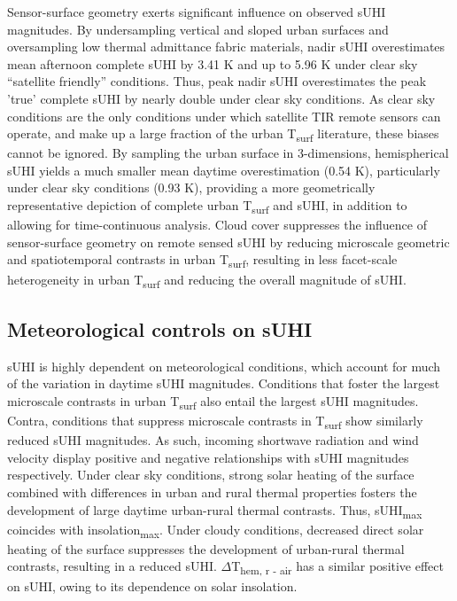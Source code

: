 Sensor-surface geometry exerts significant influence on observed sUHI magnitudes. By undersampling vertical and sloped urban surfaces and oversampling low thermal admittance fabric materials, nadir sUHI overestimates mean afternoon complete sUHI by 3.41 \si{\kelvin} and up to 5.96 \si{\kelvin} under clear sky “satellite friendly” conditions. Thus, peak nadir sUHI overestimates the peak 'true' complete sUHI by nearly double under clear sky conditions. As clear sky conditions are the only conditions under which satellite TIR remote sensors can operate, and make up a large fraction of the urban T\textsubscript{surf} literature, these biases cannot be ignored. By sampling the urban surface in 3-dimensions, hemispherical sUHI yields a much smaller mean daytime overestimation (0.54 \si{\kelvin}), particularly under clear sky conditions (0.93 \si{\kelvin}), providing a more geometrically representative depiction of complete urban T\textsubscript{surf} and sUHI, in addition to allowing for time-continuous analysis. Cloud cover suppresses the influence of sensor-surface geometry on remote sensed sUHI by reducing microscale geometric and spatiotemporal contrasts in urban T\textsubscript{surf}, resulting in less facet-scale heterogeneity in urban T\textsubscript{surf} and reducing the overall magnitude of sUHI.

\subsection{Meteorological controls on sUHI}

sUHI is highly dependent on meteorological conditions, which account for much of the variation in daytime sUHI magnitudes. Conditions that foster the largest microscale contrasts in urban T\textsubscript{surf} also entail the largest sUHI magnitudes. Contra, conditions that suppress microscale contrasts in T\textsubscript{surf} show similarly reduced sUHI magnitudes. As such, incoming shortwave radiation and wind velocity display positive and negative relationships with sUHI magnitudes respectively. Under clear sky conditions, strong solar heating of the surface combined with differences in urban and rural thermal properties fosters the development of large daytime urban-rural thermal contrasts. Thus, sUHI\textsubscript{max} coincides with insolation\textsubscript{max}. Under cloudy conditions, decreased direct solar heating of the surface suppresses the development of urban-rural thermal contrasts, resulting in a reduced sUHI. $\Delta$T\textsubscript{hem, r - air} has a similar positive effect on sUHI, owing to its dependence on solar insolation. 

